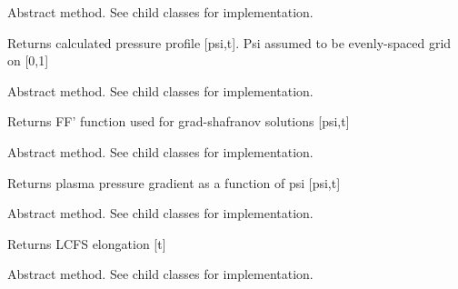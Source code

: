 \documentclass[letterpaper,10pt,english]{sphinxmanual}
\begin{document}
\begin{fulllineitems}
\begin{fulllineitems}
\end{fulllineitems}


\begin{fulllineitems}
\label{eqtools:eqtools.core.Equilibrium.getFluxPres}
Abstract method.  See child classes for implementation.

Returns calculated pressure profile {[}psi,t{]}.
Psi assumed to be evenly-spaced grid on {[}0,1{]}

\end{fulllineitems}


\begin{fulllineitems}
\label{eqtools:eqtools.core.Equilibrium.getFFPrime}
Abstract method.  See child classes for implementation.

Returns FF' function used for grad-shafranov solutions {[}psi,t{]}

\end{fulllineitems}


\begin{fulllineitems}
\label{eqtools:eqtools.core.Equilibrium.getPPrime}
Abstract method.  See child classes for implementation.

Returns plasma pressure gradient as a function of psi {[}psi,t{]}

\end{fulllineitems}


\begin{fulllineitems}
\label{eqtools:eqtools.core.Equilibrium.getElongation}
Abstract method.  See child classes for implementation.

Returns LCFS elongation {[}t{]}

\end{fulllineitems}


\begin{fulllineitems}
\label{eqtools:eqtools.core.Equilibrium.getUpperTriangularity}
Abstract method.  See child classes for implementation.


\end{fulllineitems}
\end{fulllineitems}
\end{document}
